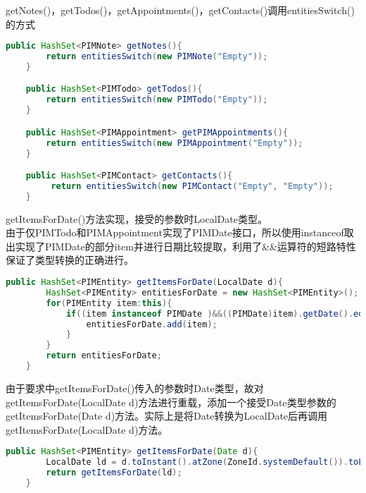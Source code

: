 \documentclass[a4paper]{article}
\begin{document}
getNotes()，getTodos()，getAppointments()，getContacts()调用entitiesSwitch()的方式

\begin{lstlisting}[language=Java]
    public HashSet<PIMNote> getNotes(){
        return entitiesSwitch(new PIMNote("Empty"));
    }

    public HashSet<PIMTodo> getTodos(){
        return entitiesSwitch(new PIMTodo("Empty"));
    }

    public HashSet<PIMAppointment> getPIMAppointments(){
        return entitiesSwitch(new PIMAppointment("Empty"));
    }

    public HashSet<PIMContact> getContacts(){
         return entitiesSwitch(new PIMContact("Empty", "Empty"));
    }
\end{lstlisting}

getItemsForDate()方法实现，接受的参数时LocalDate类型。\\
由于仅PIMTodo和PIMAppointment实现了PIMDate接口，所以使用instanceof取出实现了PIMDate的部分item并进行日期比较提取，利用了\&\&运算符的短路特性保证了类型转换的正确进行。

\begin{lstlisting}[language=Java]
    public HashSet<PIMEntity> getItemsForDate(LocalDate d){
        HashSet<PIMEntity> entitiesForDate = new HashSet<PIMEntity>();
        for(PIMEntity item:this){
            if((item instanceof PIMDate )&&((PIMDate)item).getDate().equals(d)){
                entitiesForDate.add(item);
            }
        }
        return entitiesForDate;
    }
\end{lstlisting}

由于要求中getItemsForDate()传入的参数时Date类型，故对getItemsForDate(LocalDate d)方法进行重载，添加一个接受Date类型参数的getItemsForDate(Date d)方法。实际上是将Date转换为LocalDate后再调用getItemsForDate(LocalDate d)方法。

\begin{lstlisting}[language=Java]
    public HashSet<PIMEntity> getItemsForDate(Date d){
        LocalDate ld = d.toInstant().atZone(ZoneId.systemDefault()).toLocalDate();
        return getItemsForDate(ld);
    }
\end{lstlisting}
\end{document}
